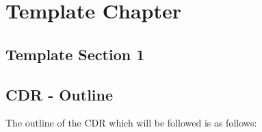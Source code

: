\chapter{Template Chapter}
\thispagestyle{fancy}

%
%
%
%
%
%
%
%
%

\section{Template Section 1}
\blindtext %





\section{CDR - Outline}
The outline of the CDR which will be followed is as follows:

